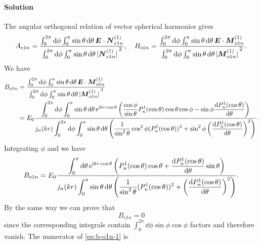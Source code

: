 \documentclass[hyperref, a4paper]{article}
\newcommand*{\ii}{\mathrm{i}}
\newcommand*{\ee}{\mathrm{e}}
\begin{document}
\paragraph{Solution} The angular orthogonal relation of vector spherical harmonics gives
\[
    A_{e1n} = \frac{\int_0^{2\pi} \dd{\phi} \int_0^\pi \sin \theta \dd{\theta} \vb*{E} \cdot \vb*{N}^{(1)}_{e1n}}{\int_0^{2\pi} \dd{\phi} \int_0^\pi \sin \theta \dd{\theta} \abs*{\vb*{N}_{e1n}^{(1)}}^2}, \quad B_{o1n} = \frac{\int_0^{2\pi} \dd{\phi} \int_0^\pi \sin \theta \dd{\theta} \vb*{E} \cdot \vb*{M}_{o1n}^{(1)}}{\int_0^{2\pi} \dd{\phi} \int_0^\pi \sin \theta \dd{\theta} \abs*{\vb*{M}^{(1)}_{o1n}}^2}.
\]
We have 
\[
    \begin{aligned}
        B_{o1n} &= \dfrac{\int_0^{2\pi} \dd{\phi} \int_0^\pi \sin \theta \dd{\theta} \vb*{E} \cdot \vb*{M}_{o1n}^{(1)}}{\int_0^{2\pi} \dd{\phi} \int_0^\pi \sin \theta \dd{\theta} \abs*{\vb*{M}^{(1)}_{o1n}}^2} \\
        &= E_0 \frac{\displaystyle \int_0^{2\pi} \dd{\phi} \int_0^\pi \sin \theta \dd{\theta} \ee^{\ii k r \cos \theta} \left( \frac{\cos\phi}{\sin\theta} P^1_n(\cos\theta) \cos\theta \cos\phi - \sin\phi \dv{P^1_n(\cos\theta)}{\theta} (-\sin\phi) \right)}{\displaystyle j_n(kr) \int_0^{2\pi} \dd{\phi} \int_0^\pi \sin \theta \dd{\theta} \left( \frac{1}{\sin^2 \theta} \cos^2\phi (P^1_n(\cos \theta))^2 + \sin^2\phi \left( \dv{P_n^1(\cos\theta)}{\theta} \right)^2 \right) }.
    \end{aligned}
\]
Integrating $\phi$ and we have 
\begin{equation}
    B_{o1n} = E_0 \frac{\displaystyle \int_0^\pi \dd{\theta} \ee^{\ii k r \cos \theta} \left( P^1_n(\cos\theta) \cos\theta + \dv{P^1_n(\cos\theta)}{\theta} \sin \theta \right)}{\displaystyle j_n(kr) \int_0^\pi \sin \theta \dd{\theta} \left( \frac{1}{\sin^2 \theta} (P^1_n(\cos \theta))^2 + \left( \dv{P_n^1(\cos\theta)}{\theta} \right)^2 \right) }.
    \label{eq:b-o1n-1}
\end{equation}
By the same way we can prove that 
\begin{equation}
    B_{e1n} = 0
    \label{eq:be1n-0}
\end{equation}
since the corresponding integrals contain $\int_0^{2\pi} \dd{\phi} \sin\phi \cos\phi$ factors and therefore vanish.
The numerator of \eqref{eq:b-o1n-1} is
\end{document}

